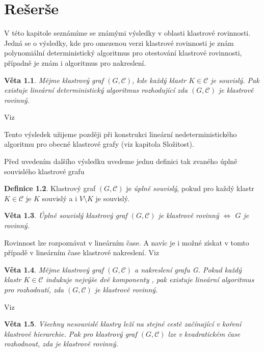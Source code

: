\documentclass[12pt,a4report]{report}
\newtheorem{theorem}{Věta}[chapter]
\theoremstyle{definition}
\newtheorem{defn}[theorem]{Definice}
\begin{document}
\author{Filip Šedivý}

\chapter{Rešerše}
V této kapitole seznámíme se známými výsledky v oblasti klastrové rovinnosti. Jedná se o výsledky, kde pro omezenou verzi klastrové rovinnosti je znám polynomiální deterministický algoritmus pro otestování klastrové rovinnosti, případně je znám i algoritmus pro nakreslení.

\begin{theorem}
Mějme klastrový graf $(G, \mathcal C)$, kde každý klastr $K \in \mathcal C$ je souvislý. Pak existuje lineární deterministický algoritmus rozhodující zda $(G, \mathcal C)$ je klastrově rovinný.
\end{theorem}

Viz \cite{CorteseEtAl08}

Tento výsledek užijeme později při konstrukci lineární nedeterministického algoritmu pro obecné klastrové grafy (viz kapitola Složitost).

Před uvedením dalšího výsledku uvedeme jednu definici tak zvaného úplně souvislého klastrové grafu

\begin{defn}
Klastrový graf $(G, \mathcal C)$ je \textit{úplně souvislý}, pokud pro každý klastr $K \in \mathcal C$ je $K$ souvislý a i $V \setminus K$ je souvislý.
\end{defn}

\begin{theorem}
Úplně souvislý klastrový graf $(G, \mathcal C)$ je  klastrově rovinný $\iff$ $G$ je rovinný.
\end{theorem}

Rovinnost lze rozpoznávat v lineárním čase. A navíc je i možné získat v tomto případě v lineárním čase klastrové nakreslení.
Viz \cite{CornelsenWagner03}

\begin{theorem}
Mějme klastrový graf $(G, \mathcal C)$ a nakreslení grafu G. Pokud každý klastr $K \in \mathcal C$ indukuje nejvýše dvě komponenty , pak existuje lineární algoritmus pro rozhodnutí, zda $(G, \mathcal C)$ je klastrově rovinný.
\end{theorem}

Viz \cite{JelinekEtAl08}

\begin{theorem}
Všechny nesouvislé klastry leží na stejné cestě začínající v koření klastrové hierarchie. Pak pro klastrový graf $(G, \mathcal C)$ lze v kvadratickém čase rozhodnout, zda je klastrově rovinný.
\end{theorem}
\end{document}
